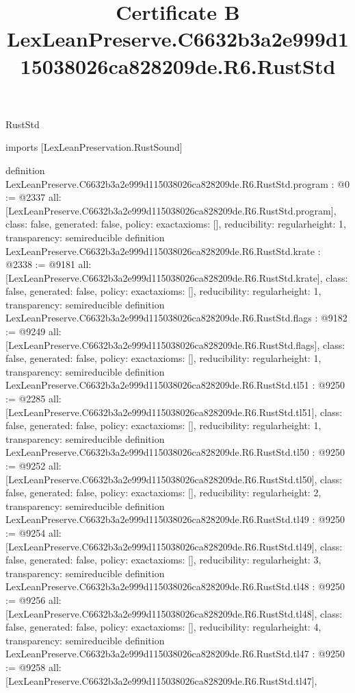 \begin{lexlean}{RustStd}
\title{Certificate B LexLeanPreserve.C6632b3a2e999d115038026ca828209de.R6.RustStd}
\begin{coremodule}
imports [LexLeanPreservation.RustSound]

definition LexLeanPreserve.C6632b3a2e999d115038026ca828209de.R6.RustStd.program : @0 := @2337 {
  all: [LexLeanPreserve.C6632b3a2e999d115038026ca828209de.R6.RustStd.program],
  class: false,
  generated: false,
  policy: exact{axioms: []},
  reducibility: regular{height: 1},
  transparency: semireducible
}
definition LexLeanPreserve.C6632b3a2e999d115038026ca828209de.R6.RustStd.krate : @2338 := @9181 {
  all: [LexLeanPreserve.C6632b3a2e999d115038026ca828209de.R6.RustStd.krate],
  class: false,
  generated: false,
  policy: exact{axioms: []},
  reducibility: regular{height: 1},
  transparency: semireducible
}
definition LexLeanPreserve.C6632b3a2e999d115038026ca828209de.R6.RustStd.flags : @9182 := @9249 {
  all: [LexLeanPreserve.C6632b3a2e999d115038026ca828209de.R6.RustStd.flags],
  class: false,
  generated: false,
  policy: exact{axioms: []},
  reducibility: regular{height: 1},
  transparency: semireducible
}
definition LexLeanPreserve.C6632b3a2e999d115038026ca828209de.R6.RustStd.tl51 : @9250 := @2285 {
  all: [LexLeanPreserve.C6632b3a2e999d115038026ca828209de.R6.RustStd.tl51],
  class: false,
  generated: false,
  policy: exact{axioms: []},
  reducibility: regular{height: 1},
  transparency: semireducible
}
definition LexLeanPreserve.C6632b3a2e999d115038026ca828209de.R6.RustStd.tl50 : @9250 := @9252 {
  all: [LexLeanPreserve.C6632b3a2e999d115038026ca828209de.R6.RustStd.tl50],
  class: false,
  generated: false,
  policy: exact{axioms: []},
  reducibility: regular{height: 2},
  transparency: semireducible
}
definition LexLeanPreserve.C6632b3a2e999d115038026ca828209de.R6.RustStd.tl49 : @9250 := @9254 {
  all: [LexLeanPreserve.C6632b3a2e999d115038026ca828209de.R6.RustStd.tl49],
  class: false,
  generated: false,
  policy: exact{axioms: []},
  reducibility: regular{height: 3},
  transparency: semireducible
}
definition LexLeanPreserve.C6632b3a2e999d115038026ca828209de.R6.RustStd.tl48 : @9250 := @9256 {
  all: [LexLeanPreserve.C6632b3a2e999d115038026ca828209de.R6.RustStd.tl48],
  class: false,
  generated: false,
  policy: exact{axioms: []},
  reducibility: regular{height: 4},
  transparency: semireducible
}
definition LexLeanPreserve.C6632b3a2e999d115038026ca828209de.R6.RustStd.tl47 : @9250 := @9258 {
  all: [LexLeanPreserve.C6632b3a2e999d115038026ca828209de.R6.RustStd.tl47],
}
\end{coremodule}
\end{lexlean}
